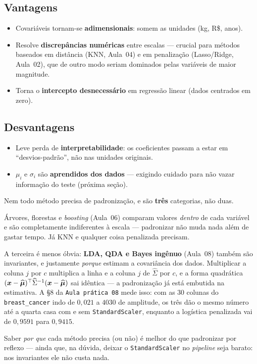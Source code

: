 \documentclass[11pt,a4paper]{article}
\begin{document}
\subsection{Vantagens}
\begin{itemize}[leftmargin=1.4cm,nosep]
  \item Covariáveis tornam-se \textbf{adimensionais}: somem as unidades (kg, R\$,
        anos).
  \item Resolve \textbf{discrepâncias numéricas} entre escalas --- crucial para
        métodos baseados em distância (KNN, Aula~04) e em penalização
        (Lasso/Ridge, Aula~02), que de outro modo seriam dominados pelas variáveis
        de maior magnitude.
  \item Torna o \textbf{intercepto desnecessário} em regressão linear (dados
        centrados em zero).
\end{itemize}

\subsection{Desvantagens}
\begin{itemize}[leftmargin=1.4cm,nosep]
  \item Leve perda de \textbf{interpretabilidade}: os coeficientes passam a estar
        em ``desvios-padrão'', não nas unidades originais.
  \item $\mu_i$ e $\sigma_i$ são \textbf{aprendidos dos dados} --- exigindo
        cuidado para não vazar informação do teste (próxima seção).
\end{itemize}

\begin{atencao}
Nem todo método precisa de padronização, e são \textbf{três} categorias, não duas.

Árvores, florestas e \emph{boosting} (Aula~06) comparam valores \emph{dentro} de
cada variável e são completamente indiferentes à escala --- padronizar não muda
nada além de gastar tempo. Já KNN e qualquer coisa penalizada precisam.

A terceira é menos óbvia: \textbf{LDA, QDA e Bayes ingênuo} (Aula~08) também são
invariantes, e justamente \emph{porque} estimam a covariância dos dados.
Multiplicar a coluna $j$ por $c$ multiplica a linha e a coluna $j$ de
$\widehat\Sigma$ por $c$, e a forma quadrática
$(\bm{x}-\widehat{\bm\mu})^\top\widehat\Sigma^{-1}(\bm{x}-\widehat{\bm\mu})$ sai idêntica
--- a padronização já está embutida na estimativa. A §8 da \texttt{Aula prática 08}
mede isso: com as 30 colunas do \texttt{breast\_cancer} indo de $0{,}021$ a $4030$
de amplitude, os três dão o mesmo número até a quarta casa com e sem
\texttt{StandardScaler}, enquanto a logística penalizada vai de $0{,}9591$ para
$0{,}9415$.

Saber \emph{por que} cada método precisa (ou não) é melhor do que padronizar por
reflexo --- ainda que, na dúvida, deixar o \texttt{StandardScaler} no
\emph{pipeline} seja barato: nos invariantes ele não custa nada.
\end{atencao}
\end{document}
